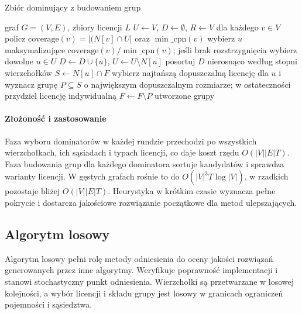 \begin{algorithm}[H]
  \caption{Zbiór dominujący z budowaniem grup}\label{alg:ds}
  \begin{algorithmic}[1]
    \Require graf $G=(V,E)$, zbiory licencji $ L$
    \State $U\gets V$, $D\gets\emptyset$, $R\gets V$
    \State dla każdego $v\in V$ policz $\mathrm{coverage}(v)=|(N[v]\cap U|$ oraz $\min\_\mathrm{cpn}(v)$
    \State wybierz $u$ maksymalizujące $\mathrm{coverage}(v)/\min\_\mathrm{cpn}(v)$; jeśli brak rozstrzygnięcia wybierz dowolne $u\in U$
    \State $D\gets D\cup\{u\}$, $U\gets U\setminus N[u]$
    \EndWhile
    \State posortuj $D$ nierosnąco według stopni wierzchołków
    \State $S\gets N[u]\cap F$
    \State wybierz najtańszą dopuszczalną licencję dla $u$ i wyznacz grupę $P\subseteq S$ o największym dopuszczalnym rozmiarze; w ostateczności przydziel licencję indywidualną
    \State $F\gets F\setminus P$
    \EndFor
    \State \Return utworzone grupy
  \end{algorithmic}
\end{algorithm}

\paragraph{Złożoność i zastosowanie}
Faza wyboru dominatorów w każdej rundzie przechodzi po wszystkich wierzchołkach, ich sąsiadach i typach licencji, co daje koszt rzędu $O(|V||E|T)$. Faza budowania grup dla każdego dominatora sortuje kandydatów i sprawdza warianty licencji. W gęstych grafach rośnie to do \(O(|V|^3 T \log |V|)\), w rzadkich pozostaje bliżej $O(|V||E|T)$. Heurystyka w krótkim czasie wyznacza pełne pokrycie i dostarcza jakościowe rozwiązanie początkowe dla metod ulepszających.

\subsection{Algorytm losowy}\label{subsec:random}

Algorytm losowy pełni rolę metody odniesienia do oceny jakości rozwiązań generowanych przez inne algorytmy. Weryfikuje poprawność implementacji i stanowi stochastyczny punkt odniesienia. Wierzchołki są przetwarzane w losowej kolejności, a wybór licencji i składu grupy jest losowy w granicach ograniczeń pojemności i sąsiedztwa.

